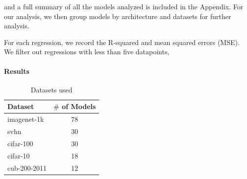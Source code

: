 and a full summary of all the models analyzed is included in the Appendix. For our analysis, we then group models by architecture and datasets for further analysis.








For each regression, we record the R-squared and mean squared errors (MSE). We filter out regressions with less than five datapoints,


\paragraph{Results}



\begin{table}[t]
\small
\begin{center}
\begin{tabular}{|p{1in}|c|}
\hline
Dataset & $\#$ of Models \\
\hline
imagenet-1k   &  78 \\
svhn          &  30 \\
cifar-100     &  30 \\
cifar-10      &  18 \\
cub-200-2011  &  12 \\
\hline
\end{tabular}
\end{center}
\caption{Datasets used}
\label{table:datasets}
\end{table}




